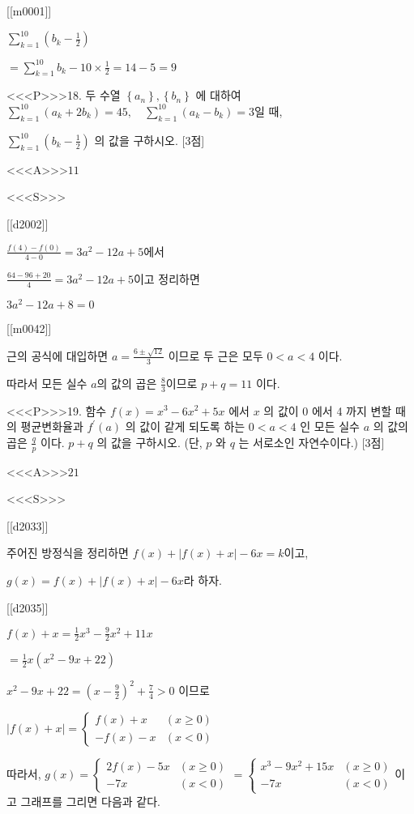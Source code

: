\documentclass{oblivoir}
\begin{document}
[[m0001]]

$ \sum_{k=1}^{10}\left(b_{k}-\frac{1}{2}\right) $

$=\sum_{k=1}^{10} b_{k}-10 \times \frac{1}{2}=14-5=9 $

<<<P>>>18. 두 수열 $\left\{a_{n}\right\},\left\{b_{n}\right\}$ 에 대하여 $\sum_{k=1}^{10}\left(a_{k}+2 b_{k}\right)=45, \quad \sum_{k=1}^{10}\left(a_{k}-b_{k}\right)=3$일 때,

$\sum_{k=1}^{10}\left(b_{k}-\frac{1}{2}\right)$ 의 값을 구하시오. [3점]

<<<A>>>$11$

<<<S>>>

[[d2002]]

$ \frac{f(4)-f(0)}{4-0}=3 a^{2}-12 a+5$에서

$\frac{64-96+20}{4}=3 a^{2}-12 a+5 $이고 정리하면

$3 a^{2}-12 a+8=0$

[[m0042]]

근의 공식에 대입하면 $a=\frac{6 \pm \sqrt{12}}{3}$ 이므로 두 근은 모두 $0<a<4$ 이다.

따라서 모든 실수 $a$의 값의 곱은 $\frac{8}{3}$이므로 $p+q=11$ 이다.


<<<P>>>19. 함수 $f(x)=x^{3}-6 x^{2}+5 x$ 에서 $x$ 의 값이 0 에서 4 까지 변할 때의 평균변화율과 $f^{\prime}(a)$ 의 값이 같게 되도록 하는 $0<a<4$ 인 모든 실수 $a$ 의 값의 곱은 $\frac{q}{p}$ 이다. $p+q$ 의 값을 구하시오. (단, $p$ 와 $q$ 는 서로소인 자연수이다.) [3점]

<<<A>>>$21$

<<<S>>>

[[d2033]]

주어진 방정식을 정리하면 $f(x)+ \left| f(x)+x \right| -6x =k$이고,

$g(x)=f(x)+ \left| f(x)+x \right| -6x $라 하자.

[[d2035]]

$f(x)+x=\frac{1}{2} x^{3}-\frac{9}{2} x^{2}+11 x$

$=\frac{1}{2} x\left(x^{2}-9 x+22\right)$

$x^{2}-9 x+22=\left(x-\frac{9}{2}\right)^{2}+\frac{7}{4}>0 $ 이므로

$|f(x)+x|= \begin{cases}f(x)+x & (x \geq 0) \\
-f(x)-x & (x<0)\end{cases}$

따라서, 
$g(x)=\begin{cases} 2f(x)-5x & (x \geq 0) \\
    -7x & (x<0)\end{cases} = \begin{cases}
x^{3}-9 x^{2}+15 x & (x \geq 0) \\
-7 x & (x<0)
\end{cases}$이고 그래프를 그리면 다음과 같다.
\end{document}
